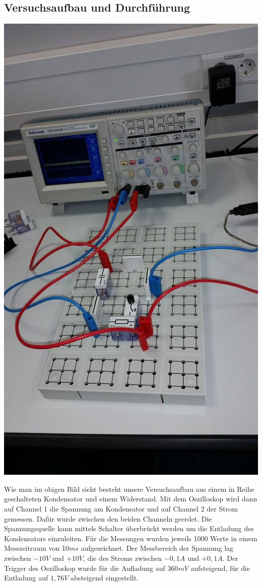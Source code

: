 \documentclass[12pt,a4paper]{article}
\begin{document}
\subsection{Versuchsaufbau und Durchführung}
\begin{center}
\includegraphics[scale=0.6]{12834525_1207198235971903_753892727_n.jpg}
\end{center}
Wie man im obigen Bild sieht besteht unsere Versuchsaufbau aus einem in Reihe geschalteten Kondensator und einem Widerstand. Mit dem Oszilloskop wird dann auf Channel 1 die Spannung am Kondensator und auf Channel 2 der Strom gemessen. Dafür wurde zwischen den beiden Channeln geerdet.
Die Spannungsquelle kann mittels Schalter überbrückt werden um die Entladung des Kondensators einzuleiten.
Für die Messungen wurden jeweils 1000 Werte in einem Messzeitraum von 10$ms$ aufgezeichnet. Der Messbereich der Spannung lag zwischen $-10V$ und $+10V$, die des Stroms zwischen $-0,1A$ und $+0,1A$.
Der Trigger des Oszilloskop wurde für die Aufladung auf $360mV$ aufsteigend, für die Entladung auf $1,76V$ absteigend eingestellt.
\end{document}
